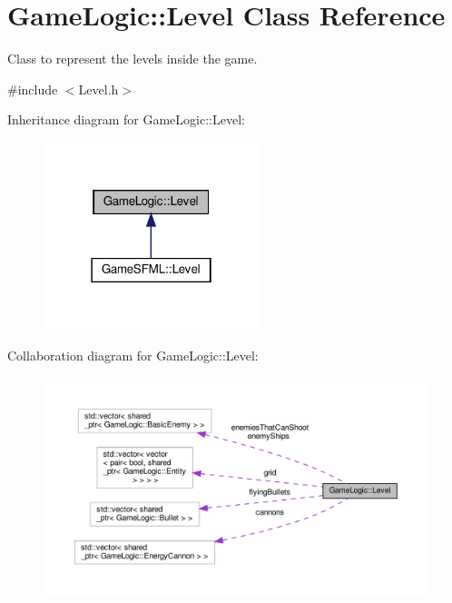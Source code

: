 \hypertarget{classGameLogic_1_1Level}{}\section{Game\+Logic\+:\+:Level Class Reference}
\label{classGameLogic_1_1Level}


Class to represent the levels inside the game.  




{\ttfamily \#include $<$Level.\+h$>$}



Inheritance diagram for Game\+Logic\+:\+:Level\+:
\nopagebreak
\begin{figure}[H]
\begin{center}
\leavevmode
\includegraphics[width=178pt]{classGameLogic_1_1Level__inherit__graph}
\end{center}
\end{figure}


Collaboration diagram for Game\+Logic\+:\+:Level\+:
\nopagebreak
\begin{figure}[H]
\begin{center}
\leavevmode
\includegraphics[width=350pt]{classGameLogic_1_1Level__coll__graph}
\end{center}
\end{figure}
